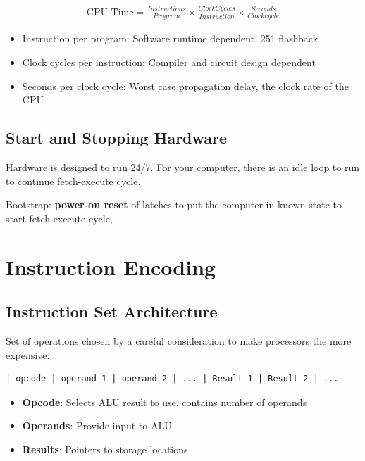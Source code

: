 \documentclass[11pt]{article}
\begin{document}
\begin{align*}
\text{CPU Time} = \frac{Instructions}{Program} \times \frac{Clock Cycles}{Instruction} \times \frac{Seconds}{Clock cycle}
\end{align*}

\begin{itemize}
\item Instruction per program: Software runtime dependent. 251 flashback
\item Clock cycles per instruction: Compiler and circuit design dependent
\item Seconds per clock cycle: Worst case propagation delay, the clock rate of the CPU
\end{itemize}

\subsection{Start and Stopping Hardware}
\label{sec:orgaf38226}

Hardware is designed to run 24/7. For your computer, there is an idle loop to run to continue fetch-execute cycle.

Bootstrap: \textbf{power-on reset} of latches to put the computer in known state to start fetch-execute cycle, 

\section{Instruction Encoding}
\label{sec:org57c6d89}

\subsection{Instruction Set Architecture}
\label{sec:orgc5188a6}

Set of operations chosen by a careful consideration to make processors the more expensive.

\begin{verbatim}
| opcode | operand 1 | operand 2 | ... | Result 1 | Result 2 | ...
\end{verbatim}

\begin{itemize}
\item \textbf{Opcode}: Selects ALU result to use, contains number of operands
\item \textbf{Operands}: Provide input to ALU
\item \textbf{Results}: Pointers to storage locations
\end{itemize}
\end{document}
